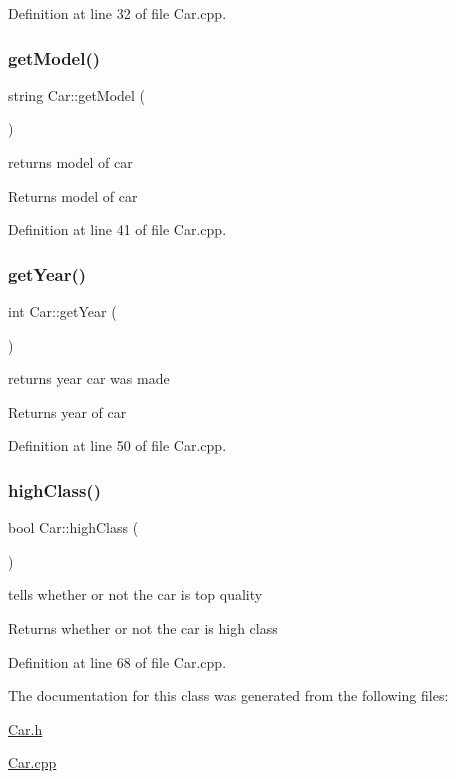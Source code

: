 Definition at line 32 of file Car.\+cpp.

\mbox{\label{class_car_a289787c878ee8aa2f5bd111ff2d927f5}} 
\subsubsection{\texorpdfstring{get\+Model()}{getModel()}}
{\footnotesize\ttfamily string Car\+::get\+Model (\begin{DoxyParamCaption}{ }\end{DoxyParamCaption})}

returns model of car

\begin{DoxyReturn}{Returns}
model of car 
\end{DoxyReturn}


Definition at line 41 of file Car.\+cpp.

\mbox{\label{class_car_a41336fc661d8919c2323a3b4554e3a19}} 
\subsubsection{\texorpdfstring{get\+Year()}{getYear()}}
{\footnotesize\ttfamily int Car\+::get\+Year (\begin{DoxyParamCaption}{ }\end{DoxyParamCaption})}

returns year car was made

\begin{DoxyReturn}{Returns}
year of car 
\end{DoxyReturn}


Definition at line 50 of file Car.\+cpp.

\mbox{\label{class_car_ae7eb35511bf597b017bfbaaa6f91ff79}} 
\subsubsection{\texorpdfstring{high\+Class()}{highClass()}}
{\footnotesize\ttfamily bool Car\+::high\+Class (\begin{DoxyParamCaption}{ }\end{DoxyParamCaption})}

tells whether or not the car is top quality

\begin{DoxyReturn}{Returns}
whether or not the car is high class 
\end{DoxyReturn}


Definition at line 68 of file Car.\+cpp.



The documentation for this class was generated from the following files\+:\begin{DoxyCompactItemize}
\item 
\hyperlink{_car_8h}{Car.\+h}\item 
\hyperlink{_car_8cpp}{Car.\+cpp}\end{DoxyCompactItemize}
